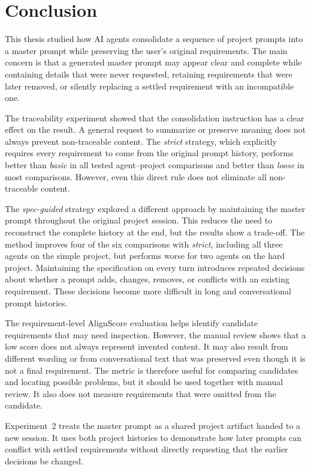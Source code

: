 \chapter{Conclusion}
\label{chap:conclusion}

This thesis studied how AI agents consolidate a sequence of project prompts
into a master prompt while preserving the user's original requirements. The
main concern is that a generated master prompt may appear clear and complete
while containing details that were never requested, retaining requirements
that were later removed, or silently replacing a settled requirement with an
incompatible one.

The traceability experiment showed that the consolidation instruction has a
clear effect on the result. A general request to summarize or preserve meaning
does not always prevent non-traceable content. The \emph{strict} strategy,
which explicitly requires every requirement to come from the original prompt
history, performs better than \emph{basic} in all tested agent--project
comparisons and better than \emph{loose} in most comparisons. However, 
even this direct rule does not eliminate all non-traceable content.

The \emph{spec-guided} strategy explored a different approach by maintaining
the master prompt throughout the original project session. This reduces the
need to reconstruct the complete history at the end, but the results show a
trade-off. The method improves four of the six comparisons with
\emph{strict}, including all three agents on the simple project, but performs
worse for two agents on the hard project. Maintaining the specification on
every turn introduces repeated decisions about whether a prompt adds, changes,
removes, or conflicts with an existing requirement. These decisions become
more difficult in long and conversational prompt histories.

The requirement-level AlignScore evaluation helps identify candidate
requirements that may need inspection. However, the manual review shows that a
low score does not always represent invented content. It may also result from
different wording or from conversational text that was preserved even though
it is not a final requirement. The metric is therefore useful for comparing
candidates and locating possible problems, but it should be used together with
manual review. It also does not measure requirements that were omitted from
the candidate.

Experiment~2 treats the master prompt as a shared project artifact handed to a
new session. It uses both project histories to demonstrate how later prompts
can conflict with settled requirements without directly requesting that the
earlier decisions be changed.

